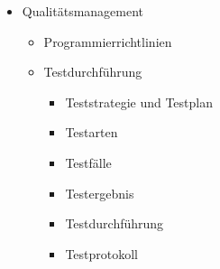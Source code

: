 \begin{itemize}
    \item Qualitätsmanagement
    \begin{itemize}
        \item Programmierrichtlinien
        \item Testdurchführung
            \begin{itemize}
                \item Teststrategie und Testplan
                \item Testarten
                \item Testfälle
                \item Testergebnis
                \item Testdurchführung
                \item Testprotokoll
            \end{itemize}
    \end{itemize}
\end{itemize}
